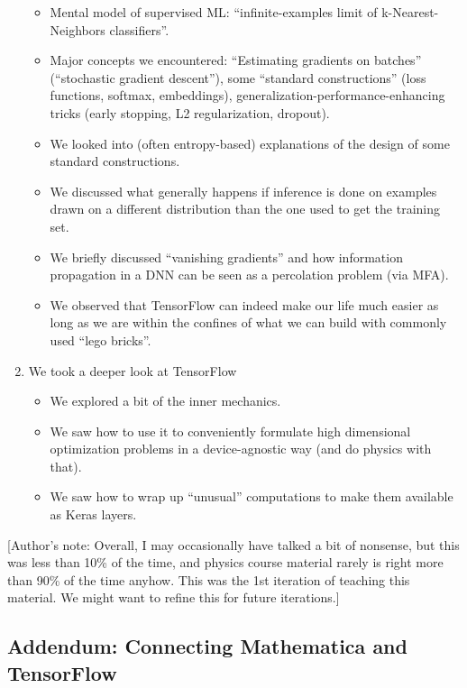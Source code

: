 \documentclass[11pt]{article}
\providecommand{\tightlist}{%
      \setlength{\itemsep}{0pt}\setlength{\parskip}{0pt}}
\begin{document}
\begin{enumerate}
  \begin{itemize}
  \tightlist
  \item
    Mental model of supervised ML: ``infinite-examples limit of
    k-Nearest-Neighbors classifiers''.
  \item
    Major concepts we encountered: ``Estimating gradients on batches''
    (``stochastic gradient descent''), some ``standard constructions''
    (loss functions, softmax, embeddings),
    generalization-performance-enhancing tricks (early stopping, L2
    regularization, dropout).
  \item
    We looked into (often entropy-based) explanations of the design of
    some standard constructions.
  \item
    We discussed what generally happens if inference is done on examples
    drawn on a different distribution than the one used to get the
    training set.
  \item
    We briefly discussed ``vanishing gradients'' and how information
    propagation in a DNN can be seen as a percolation problem (via MFA).
  \item
    We observed that TensorFlow can indeed make our life much easier as
    long as we are within the confines of what we can build with
    commonly used ``lego bricks''.
  \end{itemize}
\item
  We took a deeper look at TensorFlow

  \begin{itemize}
  \tightlist
  \item
    We explored a bit of the inner mechanics.
  \item
    We saw how to use it to conveniently formulate high dimensional
    optimization problems in a device-agnostic way (and do physics with
    that).
  \item
    We saw how to wrap up ``unusual'' computations to make them
    available as Keras layers.
  \end{itemize}
\end{enumerate}

{[}Author's note: Overall, I may occasionally have talked a bit of
nonsense, but this was less than 10\% of the time, and physics course
material rarely is right more than 90\% of the time anyhow. This was the
1st iteration of teaching this material. We might want to refine this
for future iterations.{]}

    \hypertarget{addendum-connecting-mathematica-and-tensorflow}{%
\subsection{Addendum: Connecting Mathematica and
TensorFlow}\label{addendum-connecting-mathematica-and-tensorflow}}
\end{document}

